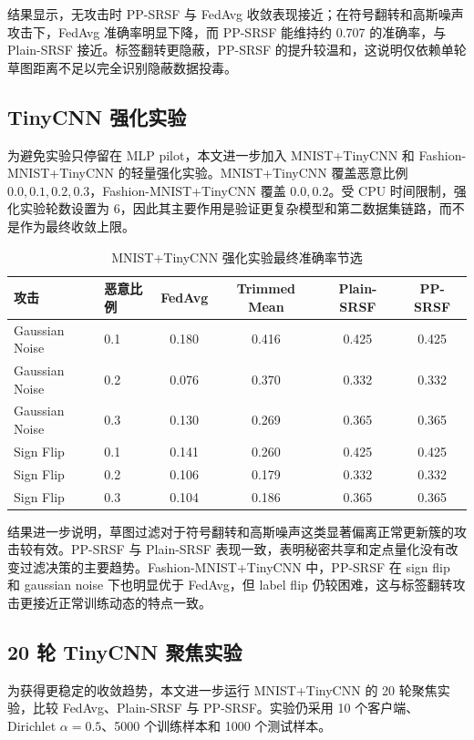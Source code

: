 \documentclass[UTF8,a4paper,zihao=-4]{ctexart}
\begin{document}
结果显示，无攻击时 PP-SRSF 与 FedAvg 收敛表现接近；在符号翻转和高斯噪声攻击下，FedAvg 准确率明显下降，而 PP-SRSF 能维持约 0.707 的准确率，与 Plain-SRSF 接近。标签翻转更隐蔽，PP-SRSF 的提升较温和，这说明仅依赖单轮草图距离不足以完全识别隐蔽数据投毒。

\subsection{TinyCNN 强化实验}
为避免实验只停留在 MLP pilot，本文进一步加入 MNIST+TinyCNN 和 Fashion-MNIST+TinyCNN 的轻量强化实验。MNIST+TinyCNN 覆盖恶意比例 $0.0,0.1,0.2,0.3$，Fashion-MNIST+TinyCNN 覆盖 $0.0,0.2$。受 CPU 时间限制，强化实验轮数设置为 6，因此其主要作用是验证更复杂模型和第二数据集链路，而不是作为最终收敛上限。

\begin{table}[h]
\centering
\caption{MNIST+TinyCNN 强化实验最终准确率节选}
\label{tab:tinycnn-strength}
\begin{tabular}{llcccc}
\toprule
攻击 & 恶意比例 & FedAvg & Trimmed Mean & Plain-SRSF & PP-SRSF\\
\midrule
Gaussian Noise & 0.1 & 0.180 & 0.416 & 0.425 & 0.425\\
Gaussian Noise & 0.2 & 0.076 & 0.370 & 0.332 & 0.332\\
Gaussian Noise & 0.3 & 0.130 & 0.269 & 0.365 & 0.365\\
Sign Flip & 0.1 & 0.141 & 0.260 & 0.425 & 0.425\\
Sign Flip & 0.2 & 0.106 & 0.179 & 0.332 & 0.332\\
Sign Flip & 0.3 & 0.104 & 0.186 & 0.365 & 0.365\\
\bottomrule
\end{tabular}
\end{table}

结果进一步说明，草图过滤对于符号翻转和高斯噪声这类显著偏离正常更新簇的攻击较有效。PP-SRSF 与 Plain-SRSF 表现一致，表明秘密共享和定点量化没有改变过滤决策的主要趋势。Fashion-MNIST+TinyCNN 中，PP-SRSF 在 sign flip 和 gaussian noise 下也明显优于 FedAvg，但 label flip 仍较困难，这与标签翻转攻击更接近正常训练动态的特点一致。

\subsection{20 轮 TinyCNN 聚焦实验}
为获得更稳定的收敛趋势，本文进一步运行 MNIST+TinyCNN 的 20 轮聚焦实验，比较 FedAvg、Plain-SRSF 与 PP-SRSF。实验仍采用 10 个客户端、Dirichlet $\alpha=0.5$、5000 个训练样本和 1000 个测试样本。
\end{document}
